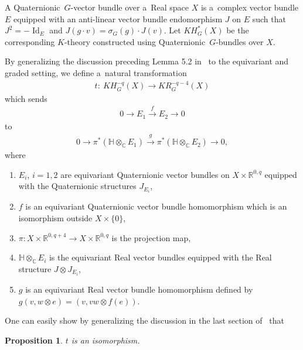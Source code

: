 \documentclass[pdftex]{sigma}
\numberwithin{equation}{section}
\newtheorem{Proposition}[Theorem]{Proposition}
{\theoremstyle{definition}
\newtheorem{Definition}[Theorem]{Definition}
\newtheorem{Example}[Theorem]{Example}
\newtheorem{Remark}[Theorem]{Remark}
}
\DeclareMathOperator{\Id}{Id}
\begin{document}
\begin{Definition}
A Quaternionic~$G$-vector bundle over a~Real space $X$ is a~complex vector bundle $E$ equipped with an anti-linear
vector bundle endomorphism $J$ on $E$ such that $J^2=-\Id_E$ and $J(g\cdot v)=
\sigma_G(g)\cdot J(v)$.
Let $KH^*_G(X)$ be the corresponding $K$-theory constructed using Quaternionic~$G$-bundles over $X$.
\end{Definition}
By generalizing the discussion preceding Lemma 5.2 in~\cite{Se} to the equivariant and graded setting, we def\/ine
a~natural transformation
\begin{gather*}
t: \ KH_G^{-q}(X)\to KR^{-q-4}_G(X)
\end{gather*}
which sends
\begin{gather*}
0\longrightarrow E_1
\stackrel{f}
{\longrightarrow} E_2\longrightarrow 0
\end{gather*}
to
\begin{gather*}
0\longrightarrow \pi^*(\mathbb{H}\otimes_\mathbb{C} E_1)\stackrel{g}
{\longrightarrow}\pi^*(\mathbb{H}\otimes_\mathbb{C}E_2)\longrightarrow 0,
\end{gather*}
where
\begin{enumerate}\itemsep=0pt
\item[1)]
$E_i$, $i=1, 2$ are equivariant Quaternionic vector bundles on $X\times\mathbb{R}^{0, q}$ equipped with the Quaternionic
structures $J_{E_i}$,
\item[2)]
$f$ is an equivariant Quaternionic vector bundle homomorphism which is an isomorphism outside $X\times\{0\}$,
\item[3)]
$\pi: X\times\mathbb{R}^{0, q+4}\to X\times\mathbb{R}^{0, q}$ is the projection map,
\item[4)]
$\mathbb{H}\otimes_\mathbb{C}E_i$ is the equivariant Real vector bundles equipped with the Real structure $J\otimes J_{E_i}$,
\item[5)]
$g$ is an equivariant Real vector bundle homomorphism def\/ined by $g(v, w\otimes e)=(v, vw\otimes f(e))$.
\end{enumerate}

One can easily show by generalizing the discussion in the last section of~\cite{AS} that
\begin{Proposition}
\label{shiftbyfour}
$t$ is an isomorphism.
\end{Proposition}
\end{document}
